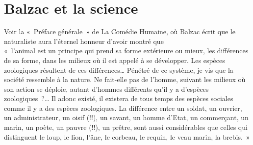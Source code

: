 \documentclass[french,twoside]{book} %
\newenvironment{quoteblock}%
  {\begin{quoting}}
  {\end{quoting}}
\newenvironment{quotebar}{%
    \def\FrameCommand{{\color{rubric!10!}\vrule width 0.5em} \hspace{0.9em}}%
    \def\OuterFrameSep{\itemsep} %
    \MakeFramed {\advance\hsize-\width \FrameRestore}
  }%
  {%
    \endMakeFramed
  }
\renewenvironment{quoteblock}%
  {%
    \savenotes
    \setstretch{0.9}
    \normalfont
    \begin{quotebar}
  }
  {%
    \end{quotebar}
    \spewnotes
  }
\begin{document}
\section[{Balzac et la science}]{Balzac et la science}

\begin{quoteblock}
 \noindent Voir la « Préface générale » de La Comédie Humaine, où Balzac écrit que le naturaliste aura l’éternel honneur d’avoir montré que \\
 « l’animal est un principe qui prend sa forme extérieure ou mieux, les différences de sa forme, dans les milieux où il est appelé à se développer. Les espèces zoologiques résultent de ces différences… Pénétré de ce système, je vis que la société ressemble à la nature. Ne fait-elle pas de l’homme, suivant les milieux où son action se déploie, autant d’hommes différents qu’il y a d’espèces zoologiques ?… Il adonc existé, il existera de tous temps des espèces sociales comme il y a des espèces zoologiques. La différence entre un soldat, un ouvrier, un administrateur, un oisif (!!), un savant, un homme d’Etat, un commerçant, un marin, un poète, un pauvre (!!), un prêtre, sont aussi considérables que celles qui distinguent le loup, le lion, l’âne, le corbeau, le requin, le veau marin, la brebis. »
\end{quoteblock}
\end{document}
